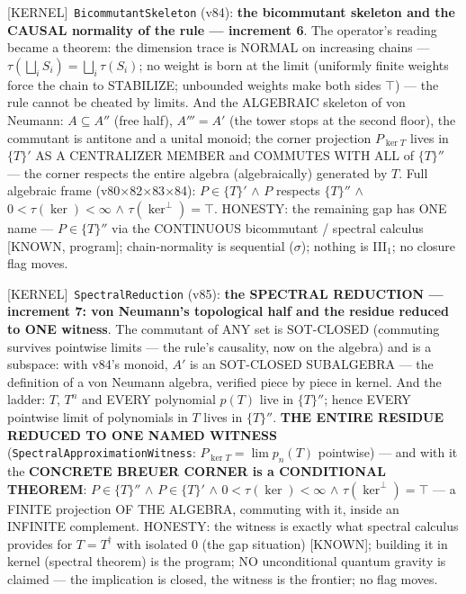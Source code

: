 \documentclass[11pt]{article}
\providecommand{\kernelmk}[1]{\textsf{[KERNEL]}~\texttt{#1}}\providecommand{\knownmk}[1]{\textsf{[KNOWN]}~{#1}}\providecommand{\statusmk}[1]{\textsf{[#1]}}
\theoremstyle{definition}\newtheorem{deriv}{Derivation}
\begin{document}
\kernelmk{BicommutantSkeleton} (v84): \textbf{the bicommutant skeleton and the CAUSAL normality of the rule --- increment 6}. The operator's reading became a theorem: the dimension trace is NORMAL on increasing chains --- $\tau(\bigsqcup_i S_i)=\bigsqcup_i\tau(S_i)$; no weight is born at the limit (uniformly finite weights force the chain to STABILIZE; unbounded weights make both sides $\top$) --- the rule cannot be cheated by limits. And the ALGEBRAIC skeleton of von Neumann: $A\subseteq A''$ (free half), $A'''=A'$ (the tower stops at the second floor), the commutant is antitone and a unital monoid; the corner projection $P_{\ker T}$ lives in $\{T\}'$ AS A CENTRALIZER MEMBER and COMMUTES WITH ALL of $\{T\}''$ --- the corner respects the entire algebra (algebraically) generated by $T$. Full algebraic frame (v80$\times$82$\times$83$\times$84): $P\in\{T\}'$ $\wedge$ $P$ respects $\{T\}''$ $\wedge$ $0<\tau(\ker)<\infty$ $\wedge$ $\tau(\ker^\perp)=\top$. HONESTY: the remaining gap has ONE name --- $P\in\{T\}''$ via the CONTINUOUS bicommutant / spectral calculus [KNOWN, program]; chain-normality is sequential ($\sigma$); nothing is III$_1$; no closure flag moves.

\kernelmk{SpectralReduction} (v85): \textbf{the SPECTRAL REDUCTION --- increment 7: von Neumann's topological half and the residue reduced to ONE witness}. The commutant of ANY set is SOT-CLOSED (commuting survives pointwise limits --- the rule's causality, now on the algebra) and is a subspace: with v84's monoid, $A'$ is an SOT-CLOSED SUBALGEBRA --- the definition of a von Neumann algebra, verified piece by piece in kernel. And the ladder: $T$, $T^n$ and EVERY polynomial $p(T)$ live in $\{T\}''$; hence EVERY pointwise limit of polynomials in $T$ lives in $\{T\}''$. \textbf{THE ENTIRE RESIDUE REDUCED TO ONE NAMED WITNESS} (\texttt{SpectralApproximationWitness}: $P_{\ker T}=\lim p_n(T)$ pointwise) --- and with it the \textbf{CONCRETE BREUER CORNER is a CONDITIONAL THEOREM}: $P\in\{T\}''$ $\wedge$ $P\in\{T\}'$ $\wedge$ $0<\tau(\ker)<\infty$ $\wedge$ $\tau(\ker^\perp)=\top$ --- a FINITE projection OF THE ALGEBRA, commuting with it, inside an INFINITE complement. HONESTY: the witness is exactly what spectral calculus provides for $T=T^\dagger$ with isolated $0$ (the gap situation) [KNOWN]; building it in kernel (spectral theorem) is the program; NO unconditional quantum gravity is claimed --- the implication is closed, the witness is the frontier; no flag moves.
\end{document}
